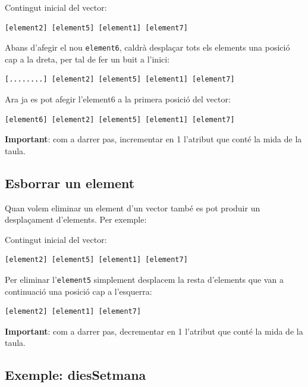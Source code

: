 \documentclass[
]{book}
\begin{document}
Contingut inicial del vector:

\begin{verbatim}
[element2] [element5] [element1] [element7]
\end{verbatim}

Abans d'afegir el nou \texttt{element6}, caldrà desplaçar tots els elements una posició cap a la dreta, per tal de fer un buit a l'inici:

\begin{verbatim}
[........] [element2] [element5] [element1] [element7]
\end{verbatim}

Ara ja es pot afegir l'element6 a la primera posició del vector:

\begin{verbatim}
[element6] [element2] [element5] [element1] [element7]
\end{verbatim}

\textbf{Important}: com a darrer pas, incrementar en 1 l'atribut que conté la mida de la taula.

\hypertarget{esborrar-un-element}{%
\subsection{Esborrar un element}\label{esborrar-un-element}}

Quan volem eliminar un element d'un vector també es pot produir un desplaçament d'elements. Per exemple:

Contingut inicial del vector:

\begin{verbatim}
[element2] [element5] [element1] [element7]
\end{verbatim}

Per eliminar l'\texttt{element5} simplement desplacem la resta d'elements que van a continuació una posició cap a l'esquerra:

\begin{verbatim}
[element2] [element1] [element7]
\end{verbatim}

\textbf{Important}: com a darrer pas, decrementar en 1 l'atribut que conté la mida de la taula.

\hypertarget{exemple-diessetmana}{%
\subsection{Exemple: diesSetmana}\label{exemple-diessetmana}}
\end{document}
